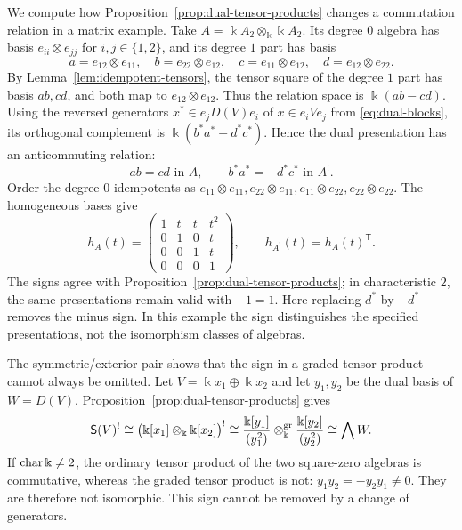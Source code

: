 \begin{advanced}[suppressfirstparskip=true,innertopmargin=0pt]
\begin{example}\label{ex:commuting-square-dual}
We compute how Proposition~\ref{prop:dual-tensor-products} changes a commutation relation in a matrix example.
Take $A=\Bbbk A_2\otimes_\Bbbk\Bbbk A_2$.
Its degree $0$ algebra has basis $e_{ii}\otimes e_{jj}$ for $i,j\in\{1,2\}$, and its degree $1$ part has basis
\[
a=e_{12}\otimes e_{11},\quad
b=e_{22}\otimes e_{12},\quad
c=e_{11}\otimes e_{12},\quad
d=e_{12}\otimes e_{22}.
\]
By Lemma~\ref{lem:idempotent-tensors}, the tensor square of the degree $1$ part has basis $ab,cd$, and both map to $e_{12}\otimes e_{12}$. Thus the relation space is $\Bbbk(ab-cd)$.
Using the reversed generators $x^*\in e_jD(V)e_i$ of $x\in e_iVe_j$ from \eqref{eq:dual-blocks}, its orthogonal complement is $\Bbbk(b^*a^*+d^*c^*)$.
Hence the dual presentation has an anticommuting relation:
\[
ab=cd\text{ in }A,\qquad
b^*a^*=-d^*c^*\text{ in }A^!.
\]
Order the degree $0$ idempotents as
$e_{11}\otimes e_{11},e_{22}\otimes e_{11},e_{11}\otimes e_{22},e_{22}\otimes e_{22}$.
The homogeneous bases give
\[
h_A(t)=\begin{pmatrix}
1&t&t&t^2\\
0&1&0&t\\
0&0&1&t\\
0&0&0&1
\end{pmatrix},\qquad
h_{A^!}(t)=h_A(t)^{\mathsf T}.
\]
The signs agree with Proposition~\ref{prop:dual-tensor-products}; in characteristic $2$, the same presentations remain valid with $-1=1$.
Here replacing $d^*$ by $-d^*$ removes the minus sign. In this example the sign distinguishes the specified presentations, not the isomorphism classes of algebras.
\end{example}

\begin{example}\label{ex:essential-tensor-sign}
The symmetric/exterior pair shows that the sign in a graded tensor product cannot always be omitted.
Let $V=\Bbbk x_1\oplus\Bbbk x_2$ and let $y_1,y_2$ be the dual basis of $W=D(V)$. Proposition~\ref{prop:dual-tensor-products} gives
\[
\mathsf{S}(V)^!
\cong\bigl(\Bbbk[x_1]\otimes_\Bbbk\Bbbk[x_2]\bigr)^!
\cong\frac{\Bbbk[y_1]}{(y_1^2)}\otimes_\Bbbk^{\mathrm{gr}}
       \frac{\Bbbk[y_2]}{(y_2^2)}
\cong\bigwedge W.
\]
If $\operatorname{char}\Bbbk\neq2$, the ordinary tensor product of the two square-zero algebras is commutative, whereas the graded tensor product is not: $y_1y_2=-y_2y_1\neq0$.
They are therefore not isomorphic. This sign cannot be removed by a change of generators.
\end{example}
\end{advanced}

